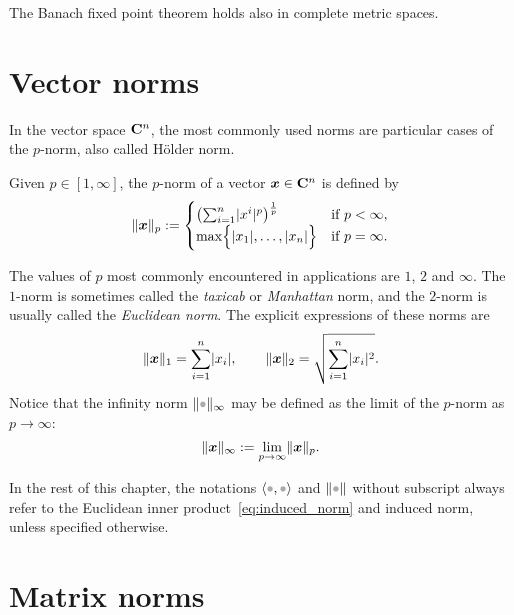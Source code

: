 \begin{remark}
    The Banach fixed point theorem holds also in complete metric spaces.
\end{remark}

\section{Vector norms}%
\label{sub:vector_norms}

In the vector space $\mathbf C^n$,
the most commonly used norms are particular cases of the $p$-norm, also called H\"older norm.

\begin{definition}
    \label{definition:pnorm_vector}
    Given $p \in [1, \infty]$,
    the $p$-norm of a vector $\mathbf{\boldsymbol{x}} \in \mathbf C^n$ is defined by
    \[
        \lVert\mathbf{\boldsymbol{x}}\rVert_p :=
        \begin{cases}
            \left( \sum_{i=1}^{n} \lvert x^i\rvert^p \right)^{\frac{1}{p}} & \text{if $p < \infty$}, \\
            \max \Bigl\{ \lvert x_1\rvert, \dotsc, \lvert x_n\rvert \Bigr\} & \text{if $p = \infty$}.
        \end{cases}
    \]
\end{definition}
The values of $p$ most commonly encountered in applications are $1$, $2$ and $\infty$.
The $1$-norm is sometimes called the \emph{taxicab} or \emph{Manhattan} norm,
and the $2$-norm is usually called the \emph{Euclidean norm}.
The explicit expressions of these norms are
\[
    \lVert\mathbf{\boldsymbol{x}}\rVert_1 = \sum_{i=1}^{n} \lvert x_i\rvert,
    \qquad
    \lVert\mathbf{\boldsymbol{x}}\rVert_2 = \sqrt{\sum_{i=1}^{n} \lvert x_i\rvert^2}.
\]
Notice that the infinity norm $\norm{\placeholder}_{\infty}$ may be defined as the limit of the $p$-norm as $p \to \infty$:
\[
    \lVert\mathbf{\boldsymbol{x}}\rVert_{\infty}
    := \lim_{p \to \infty} \lVert\mathbf{\boldsymbol{x}}\rVert_p.
\]

In the rest of this chapter,
the notations $\ip{\placeholder,\placeholder}$ and $\norm{\placeholder}$ without subscript always refer to the Euclidean inner product~\eqref{eq:induced_norm} and induced norm,
unless specified otherwise.

\section{Matrix norms}%
\label{sec:matrix_norms}

